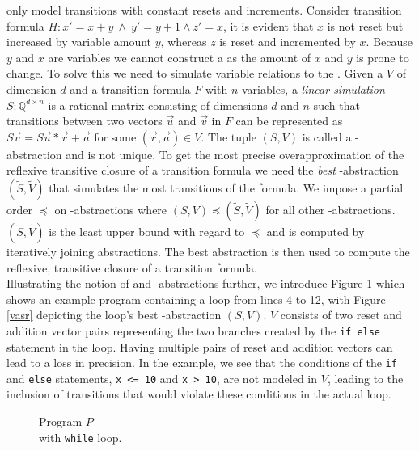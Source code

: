 \qvasr only model transitions with constant resets and increments. Consider transition formula $H: x' = x + y\ \land\ y' = y + 1 \land z' = x$, it is evident that $x$ is not reset but increased by variable amount $y$, whereas $z$ is reset and incremented by $x$. Because $y$ and $x$ are variables we cannot construct a \qvasr as the amount of $x$ and $y$ is prone to change. To solve this we need to simulate variable relations to the \qvasr. Given a \qvasr $V$ of dimension $d$ and a transition formula $F$ with $n$ variables, a \textsl{linear simulation} $S: \mathbb{Q}^{d \times n} $ is a rational matrix consisting of dimensions $d$ and $n$ such that transitions between two vectors $\vec{u}$ and $\vec{v}$ in $F$ can be represented as $S\vec{v} = S\vec{u} * \vec{r} + \vec{a}$ for some $(\vec{r}, \vec{a}) \in V$. The tuple $(S, V)$ is called a \qvasr-abstraction and is not unique. To get the most precise overapproximation of the reflexive transitive closure of a transition formula we need the \textsl{best} \qvasr-abstraction $(\tilde{S}, \tilde{V})$ that simulates the most transitions of the formula. We impose a partial order $\preceq$ on \qvasr-abstractions where $(S, V) \preceq (\tilde{S}, \tilde{V})$ for all other \qvasr-abstractions. $(\tilde{S}, \tilde{V})$ is the least upper bound with regard to $\preceq$ and is computed by iteratively joining abstractions. The best abstraction is then used to compute the reflexive, transitive closure of a transition formula. \\ Illustrating the notion of \qvasr and \qvasr-abstractions further, we introduce Figure \ref{code} which shows an example program containing a loop from lines 4 to 12, with Figure \ref{vasr} depicting the loop's best \qvasr-abstraction $(S,V)$. $V$ consists of two reset and addition vector pairs representing the two branches created by the \texttt{if else} statement in the loop. Having multiple pairs of reset and addition vectors can lead to a loss in precision. In the example, we see that the conditions of the \texttt{if} and \texttt{else} statements, \texttt{x <= 10} and \texttt{x > 10}, are not modeled in $V$, leading to the inclusion of transitions that would violate these conditions in the actual loop. \\
\begin{minipage}[t]{0.3\linewidth} \centering
	\begin{figure}[H]
		
		\caption{Program $P$ \\ with \texttt{while} loop.}
		\label{code}
	\end{figure}
\end{minipage}
